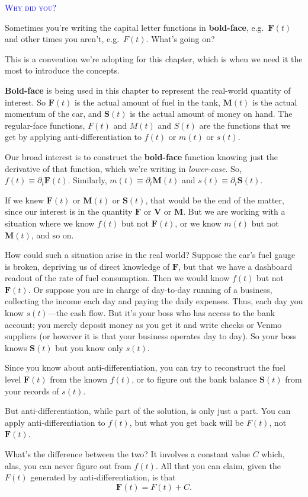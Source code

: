 \documentclass[
  letterpaper,
  DIV=11,
  numbers=noendperiod,
  oneside]{scrreprt}
\newenvironment{why}%
{%
\textcolor{blue}{\hrulefill}%
  \par\vspace{.3\baselineskip}%
  \textcolor{blue}{\scshape Why did you?}%
  \par\vspace{\baselineskip}%
}%
{\textcolor{blue}{\hrulefill}}
\begin{document}
\begin{why}
Sometimes you're writing the capital letter functions in
\textbf{bold-face}, e.g.~\({\mathbf F}(t)\) and other times you aren't,
e.g.~\(F(t)\). What's going on?

This is a convention we're adopting for this chapter, which is when we
need it the most to introduce the concepts.

\textbf{Bold-face} is being used in this chapter to represent the
real-world quantity of interest. So \({\mathbf F}(t)\) is the actual
amount of fuel in the tank, \({\mathbf M}(t)\) is the actual momentum of
the car, and \({\mathbf S}(t)\) is the actual amount of money on hand.
The regular-face functions, \(F(t)\) and \(M(t)\) and \(S(t)\) are the
functions that we get by applying anti-differentiation to \(f(t)\) or
\(m(t)\) or \(s(t)\).

Our broad interest is to construct the \textbf{bold-face} function
knowing just the derivative of that function, which we're writing in
\emph{lower-case}. So, \(f(t) \equiv \partial_t {\mathbf F}(t)\).
Similarly, \(m(t) \equiv \partial_t {\mathbf M}(t)\) and
\(s(t) \equiv \partial_t {\mathbf S}(t)\).

If we knew \({\mathbf F}(t)\) or \({\mathbf M}(t)\) or
\({\mathbf S}(t)\), that would be the end of the matter, since our
interest is in the quantity \({\mathbf F}\) or \({\mathbf V}\) or
\({\mathbf M}\). But we are working with a situation where we know
\(f(t)\) but not \({\mathbf F}(t)\), or we know \(m(t)\) but not
\({\mathbf M}(t)\), and so on.

How could such a situation arise in the real world? Suppose the car's
fuel gauge is broken, depriving us of direct knowledge of \(\mathbf F\),
but that we have a dashboard readout of the rate of fuel consumption.
Then we would know \(f(t)\) but not \({\mathbf F}(t)\). Or suppose you
are in charge of day-to-day running of a business, collecting the income
each day and paying the daily expenses. Thus, each day you know
\(s(t)\)---the cash flow. But it's your boss who has access to the bank
account; you merely deposit money as you get it and write checks or
Venmo suppliers (or however it is that your business operates day to
day). So your boss knows \({\mathbf S}(t)\) but you know only \(s(t)\).

Since you know about anti-differentiation, you can try to reconstruct
the fuel level \({\mathbf F}(t)\) from the known \(f(t)\), or to figure
out the bank balance \({\mathbf S}(t)\) from your records of \(s(t)\).

But anti-differentiation, while part of the solution, is only just a
part. You can apply anti-differentiation to \(f(t)\), but what you get
back will be \(F(t)\), not \({\mathbf F}(t)\).

What's the difference between the two? It involves a constant value
\(C\) which, alas, you can never figure out from \(f(t)\). All that you
can claim, given the \(F(t)\) generated by anti-differentiation, is that
\[{\mathbf F}(t) = F(t) + C .\]

\end{why}
\end{document}

